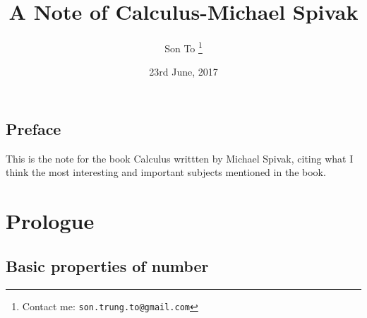 \documentclass[a4paper,11pt,oneside]{book}
\begin{document}
\title{A Note of Calculus-Michael Spivak}
\author{Son To
  \thanks{Contact me: \texttt{son.trung.to@gmail.com}}}
\date{23rd June, 2017}

\maketitle

\frontmatter
    \chapter*{Preface}
      This is the note for the book Calculus
      writtten by Michael Spivak,
      citing what I think the most interesting
      and important subjects
      mentioned in the book.
    \tableofcontents
\mainmatter
  \part{Prologue}
    \chapter{Basic properties of number}
\end{document}
